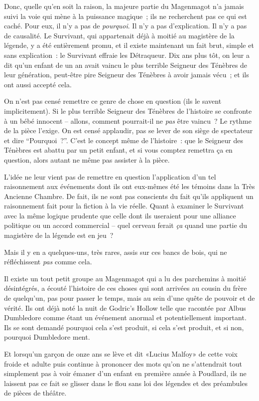 Donc, quelle qu'en soit la raison, la majeure partie du Magenmagot n'a jamais suivi la voie qui mène à la puissance magique~; ils ne recherchent pas ce qui est caché. Pour eux, il n'y a pas de \emph{pourquoi}. Il n'y a pas d'explication. Il n'y a pas de causalité. Le Survivant, qui appartenait déjà à moitié au magistère de la légende, y a été entièrement promu, et il existe maintenant un fait brut, simple et sans explication~: le Survivant effraie les Détraqueur. Dix ans plus tôt, on leur a dit qu'un enfant de un an avait vaincu le plus terrible Seigneur des Ténèbres de leur génération, peut-être pire Seigneur des Ténèbres à avoir jamais vécu~; et ils ont aussi accepté cela.

On n'est pas censé remettre ce genre de chose en question (ils le savent implicitement). Si le plus terrible Seigneur des Ténèbres de l'histoire se confronte à un bébé innocent -- allons, comment pourrait-il ne \emph{pas} être vaincu~? Le rythme de la pièce l'exige. On est censé applaudir, pas se lever de son siège de spectateur et dire “Pourquoi~?”. C'est le concept même de l'histoire~: que le Seigneur des Ténèbres est abattu par un petit enfant, et si vous comptez remettra ça en question, alors autant ne même pas assister à la pièce.

L'idée ne leur vient pas de remettre en question l'application d'un tel raisonnement aux événements dont ils ont eux-mêmes été les témoins dans la Très Ancienne Chambre. De fait, ils ne sont pas conscients du fait qu'ils appliquent un raisonnement fait pour la fiction à la vie réelle. Quant à examiner le Survivant avec la même logique prudente que celle dont ils useraient pour une alliance politique ou un accord commercial -- quel cerveau ferait \emph{ça} quand une partie du magistère de la légende est en jeu~?

Mais il y en a quelques-uns, très rares, assis sur ces bancs de bois, qui ne réfléchissent \emph{pas} comme cela.

Il existe un tout petit groupe au Magenmagot qui a lu des parchemins à moitié désintégrés, a écouté l'histoire de ces choses qui sont arrivées au cousin du frère de quelqu'un, pas pour passer le temps, mais au sein d'une quête de pouvoir et de vérité. Ils ont déjà noté la nuit de Godric's Hollow telle que racontée par Albus Dumbledore comme étant un événement anormal et potentiellement important. Ils se sont demandé pourquoi cela s'est produit, si cela s'est produit, et si non, pourquoi Dumbledore ment.

Et lorsqu'un garçon de onze ans se lève et dit «Lucius Malfoy» de cette voix froide et adulte puis continue à prononcer des mots qu'on ne s'attendrait tout simplement pas à voir émaner d'un enfant en première année à Poudlard, ils ne laissent pas ce fait se glisser dans le flou sans loi des légendes et des préambules de pièces de théâtre.

